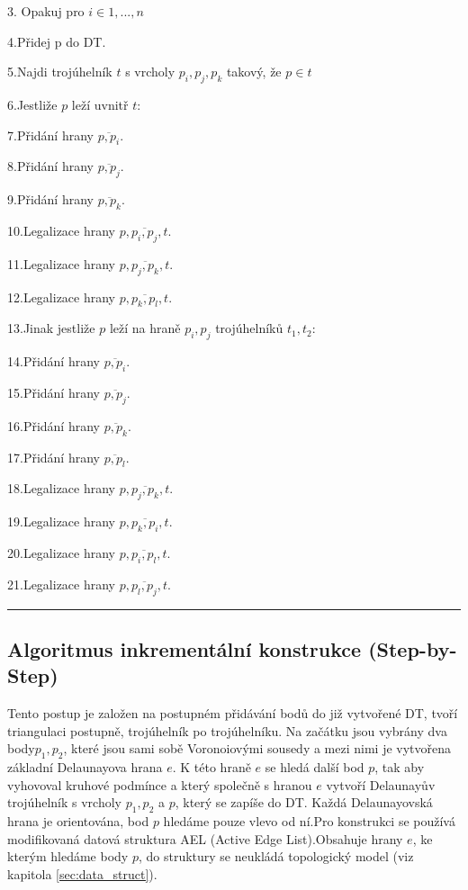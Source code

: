\documentclass[12pt,a4paper]{article}
\begin{document}
3.  Opakuj pro $i \in 1,...,n$

4.\indent  Přidej p do DT.

5.\indent  Najdi trojúhelník $t$ s vrcholy $p_i, p_j, p_k$ takový, že $p \in t$

6.\indent  Jestliže $p$ leží uvnitř $t$:

7.\indent \indent Přidání hrany $\overline{p,p_i}$.

8.\indent \indent Přidání hrany $\overline{p,p_j}$.

9.\indent \indent Přidání hrany $\overline{p,p_k}$.

10.\indent \indent Legalizace hrany $p,\overline{p_i,p_j},t$.

11.\indent \indent Legalizace hrany $p,\overline{p_j,p_k},t$.

12.\indent \indent Legalizace hrany $p,\overline{p_k,p_l},t$.

13.\indent Jinak jestliže $p$ leží na hraně $p_i, p_j$ trojúhelníků $t_1, t_2$:

14.\indent \indent Přidání hrany $\overline{p,p_i}$.

15.\indent \indent Přidání hrany $\overline{p,p_j}$.

16.\indent \indent Přidání hrany $\overline{p,p_k}$.

17.\indent \indent Přidání hrany $\overline{p,p_l}$.

18.\indent \indent Legalizace hrany $p,\overline{p_j,p_k},t$.

19.\indent \indent Legalizace hrany $p,\overline{p_k,p_i},t$.

20.\indent \indent Legalizace hrany $p,\overline{p_i,p_l},t$.

21.\indent \indent Legalizace hrany $p,\overline{p_l,p_j},t$.
\newline
\hrule

\newpage
\subsection{Algoritmus inkrementální konstrukce (Step-by-Step)}

Tento postup je založen na postupném přidávání bodů do již vytvořené DT, tvoří triangulaci postupně, trojúhelník po trojúhelníku. Na začátku jsou vybrány dva body$p_1, p_2$, které jsou sami sobě Voronoiovými sousedy a mezi nimi je vytvořena základní Delaunayova hrana $e$. K této hraně $e$ se hledá další bod 	$p$, tak aby vyhovoval kruhové podmínce a který společně s hranou $e$ vytvoří Delaunayův trojúhelník s vrcholy $p_1, p_2$ a $p$, který se zapíše do DT. Každá Delaunayovská hrana je orientována, bod $p$ hledáme pouze vlevo od ní.Pro konstrukci se používá modifikovaná datová struktura AEL (Active Edge List).Obsahuje hrany $e$, ke kterým hledáme body $p$, do struktury se neukládá topologický model (viz kapitola \ref{sec:data_struct}).
\end{document}

